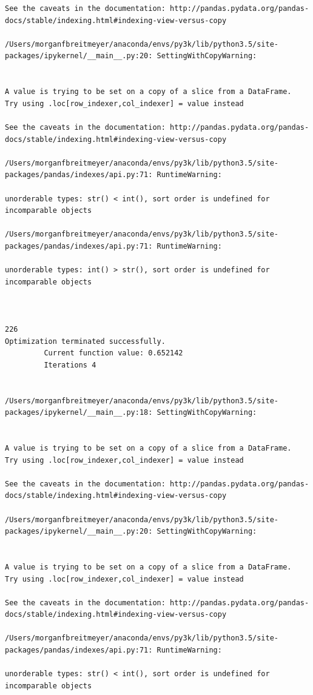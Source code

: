 \begin{lstlisting}
See the caveats in the documentation: http://pandas.pydata.org/pandas-docs/stable/indexing.html#indexing-view-versus-copy

/Users/morganfbreitmeyer/anaconda/envs/py3k/lib/python3.5/site-packages/ipykernel/__main__.py:20: SettingWithCopyWarning:


A value is trying to be set on a copy of a slice from a DataFrame.
Try using .loc[row_indexer,col_indexer] = value instead

See the caveats in the documentation: http://pandas.pydata.org/pandas-docs/stable/indexing.html#indexing-view-versus-copy

/Users/morganfbreitmeyer/anaconda/envs/py3k/lib/python3.5/site-packages/pandas/indexes/api.py:71: RuntimeWarning:

unorderable types: str() < int(), sort order is undefined for incomparable objects

/Users/morganfbreitmeyer/anaconda/envs/py3k/lib/python3.5/site-packages/pandas/indexes/api.py:71: RuntimeWarning:

unorderable types: int() > str(), sort order is undefined for incomparable objects



226
Optimization terminated successfully.
         Current function value: 0.652142
         Iterations 4


/Users/morganfbreitmeyer/anaconda/envs/py3k/lib/python3.5/site-packages/ipykernel/__main__.py:18: SettingWithCopyWarning:


A value is trying to be set on a copy of a slice from a DataFrame.
Try using .loc[row_indexer,col_indexer] = value instead

See the caveats in the documentation: http://pandas.pydata.org/pandas-docs/stable/indexing.html#indexing-view-versus-copy

/Users/morganfbreitmeyer/anaconda/envs/py3k/lib/python3.5/site-packages/ipykernel/__main__.py:20: SettingWithCopyWarning:


A value is trying to be set on a copy of a slice from a DataFrame.
Try using .loc[row_indexer,col_indexer] = value instead

See the caveats in the documentation: http://pandas.pydata.org/pandas-docs/stable/indexing.html#indexing-view-versus-copy

/Users/morganfbreitmeyer/anaconda/envs/py3k/lib/python3.5/site-packages/pandas/indexes/api.py:71: RuntimeWarning:

unorderable types: str() < int(), sort order is undefined for incomparable objects


\end{lstlisting}
